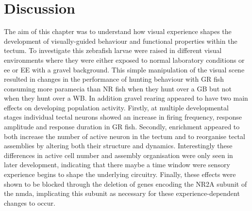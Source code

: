 \section{Discussion}
 The aim of this chapter was to understand how visual experience shapes the development of visually-guided behaviour and functional properties within the tectum. To investigate this zebrafish larvae were raised in different visual environments where they were either exposed to normal laboratory conditions or \gls{ee} or EE with a gravel background. This simple manipulation of the visual scene resulted in changes in the performance of hunting behaviour with GR fish consuming more paramecia than NR fish  when they hunt over a GB but not when they hunt over a WB. In addition gravel rearing appeared to have two main effects on developing population activity. Firstly, at multiple developmental stages individual tectal neurons showed an increase in firing frequency, response amplitude and response duration in GR fish. Secondly, enrichment appeared to both increase the number of active neuron in the tectum and to reorganise tectal assemblies by altering both their structure and dynamics. Interestingly these differences in active cell number and assembly organisation were only seen in later development, indicating that there maybe a time window were sensory experience begins to shape the underlying circuitry. Finally, these effects were shown to be blocked through the deletion of genes encoding the NR2A subunit of the \gls{nmda}, implicating this subunit as necessary for these experience-dependent changes to occur.
 
